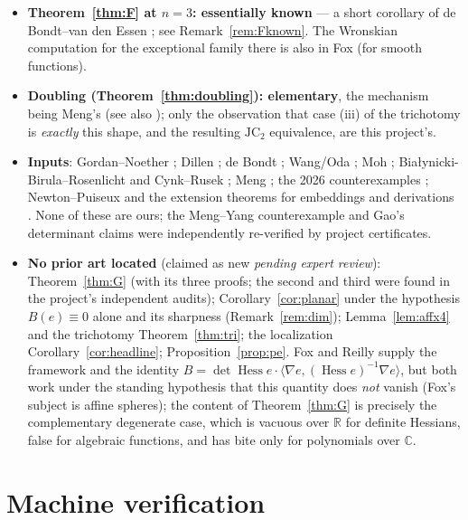 \documentclass[11pt]{article}
\theoremstyle{plain}
\theoremstyle{definition}
\newcommand{\C}{\mathbb{C}}
\newcommand{\R}{\mathbb{R}}
\newcommand{\Hess}{\operatorname{Hess}}
\newcommand{\JC}{\mathrm{JC}}
\begin{document}
\begin{itemize}
\cite[Prop.~4]{Reilly}; Fox \cite{Fox2017}, whose invariant $U(F)$ is
exactly $B$ and who proves $U(F)=\mathcal{K}\,|dF|^{\,n+2}$. The
underlying bordered-determinant expansion is Cauchy's.
\item\textbf{Theorem~\ref{thm:F} at $n=3$: essentially known} --- a
short corollary of de Bondt--van den Essen \cite[Thm.~3.3]{dBvdE}; see
Remark~\ref{rem:Fknown}. The Wronskian computation for the exceptional
family there is also in Fox \cite{Fox2017} (for smooth functions).
\item\textbf{Doubling (Theorem~\ref{thm:doubling}): elementary}, the
mechanism being Meng's \cite{Meng2006} (see also
\cite[Prop.~2.3]{MengYang}); only the observation that case (iii) of
the trichotomy is \emph{exactly} this shape, and the resulting $\JC_2$
equivalence, are this project's.
\item\textbf{Inputs}: Gordan--Noether \cite{GN,WdB}; Dillen
\cite{Dillen}; de Bondt \cite{deBondt2015}; Wang/Oda \cite{Wang,BCW};
Moh \cite{Moh}; Bia{\l}ynicki-Birula--Rosenlicht \cite{BBR} and
Cynk--Rusek \cite{CynkRusek}; Meng \cite{Meng2006}; the 2026
counterexamples \cite{MengYang,Gao}; Newton--Puiseux \cite{Walker} and
the extension theorems for embeddings and derivations \cite{Lang}. None
of these are ours; the Meng--Yang counterexample and Gao's determinant
claims were independently re-verified by project certificates.
\item\textbf{No prior art located} (claimed as new \emph{pending expert
review}): Theorem~\ref{thm:G} (with its three proofs; the second and
third were found in the project's independent audits);
Corollary~\ref{cor:planar} under the hypothesis $B(e)\equiv0$ alone and
its sharpness (Remark~\ref{rem:dim}); Lemma~\ref{lem:affx4} and the
trichotomy Theorem~\ref{thm:tri}; the localization
Corollary~\ref{cor:headline}; Proposition~\ref{prop:pe}. Fox and Reilly
supply the framework and the identity
$B=\det\Hess e\cdot\langle\nabla e,(\Hess e)^{-1}\nabla e\rangle$, but
both work under the standing hypothesis that this quantity does
\emph{not} vanish (Fox's subject is affine spheres); the content of
Theorem~\ref{thm:G} is precisely the complementary degenerate case,
which is vacuous over $\R$ for definite Hessians, false for algebraic
functions, and has bite only for polynomials over $\C$.
\end{itemize}

\appendix

\section{Machine verification}\label{sec:verification}
\end{document}
